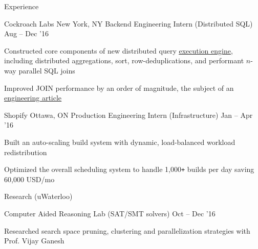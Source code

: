 \documentclass{resume} %
\begin{document}
\begin{rSection}{Experience}
  \begin{rWorkSection}{Cockroach Labs}
                     {New York, NY}
                     {Backend Engineering Intern (Distributed SQL)}
                     {Aug -- Dec '16}
    \item Constructed core components of new distributed query
      \href{https://github.com/cockroachdb/cockroach/blob/master/docs/RFCS/20160421_distributed_sql.md}
      {\underline{execution engine}}, including distributed aggregations, sort,
      row-deduplications, and performant $n$-way parallel SQL joins
    \item Improved JOIN performance by an order of magnitude, the
      subject of an
      \href{https://www.cockroachlabs.com/blog/better-sql-joins-in-cockroachdb/}
      {\underline{engineering article}}
  \end{rWorkSection}

  \begin{rWorkSection}{Shopify}
                     {Ottawa, ON}
                     {Production Engineering Intern (Infrastructure)}
                     {Jan -- Apr '16}
  \item Built an auto-scaling build system with dynamic, load-balanced
    workload redistribution
  \item Optimized the overall scheduling system to handle 1,000\texttt{+}
    builds per day saving 60,000 USD/mo
  \end{rWorkSection}
  \vspace{0.5em}
\end{rSection}


\begin{rSection}{Research (uWaterloo)}
  \begin{rResearchSection}{Computer Aided Reasoning Lab}
                     {(SAT/SMT solvers)}
                     {Oct -- Dec '16}
   \item Researched search space pruning, clustering and
     parallelization strategies with Prof. Vijay Ganesh
  \end{rResearchSection}
  \vspace{0.5em}
\end{rSection}

\end{document}
